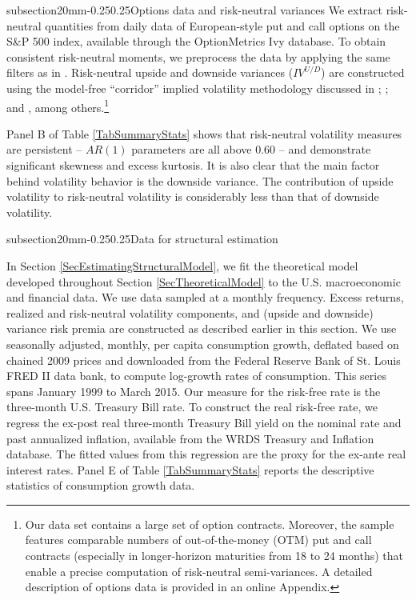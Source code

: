 \documentclass[11pt]{article}
\makeatletter
\renewcommand\subsection{\@startsection%
    {subsection}{2}{0mm}{-0.25\baselineskip}{0.25\baselineskip}{\bfseries\large}}
\makeatother
\begin{document}
\subsection{Options data and risk-neutral variances}
We extract risk-neutral quantities from daily data of European-style put and call options on the S\&P 500 index, available through the OptionMetrics Ivy database. To obtain consistent risk-neutral moments, we preprocess the data by applying the same filters as in \cite{ChangChristoffersenJacobs13JFE}. Risk-neutral upside and downside variances ($IV^{U/D}$) are constructed using the model-free ``corridor'' implied volatility methodology discussed in \cite{AndersenBondarenkoGonzalez14CorridorVol}; \cite{AndersenBondarenko07}; and \cite{CarrMadan99OptionPriceFormula}, among others.\footnote{Our data set contains a large set of option contracts. Moreover, the sample features comparable numbers of out-of-the-money (OTM) put and call contracts (especially in longer-horizon maturities from 18 to 24 months) that enable a precise computation of risk-neutral semi-variances. A detailed description of options data is provided in an online Appendix.}

Panel B of Table \ref{TabSummaryStats} shows that risk-neutral volatility measures are persistent -- $AR(1)$ parameters are all above 0.60 -- and demonstrate significant skewness and excess kurtosis. It is also clear that the main factor behind volatility behavior is the downside variance.
The contribution of upside volatility to risk-neutral volatility is considerably less than that of downside volatility.

\subsection{Data for structural estimation}

In Section \ref{SecEstimatingStructuralModel}, we fit the theoretical model developed throughout Section \ref{SecTheoreticalModel} to the U.S. macroeconomic and financial data. We use data sampled at a monthly frequency. Excess returns, realized and risk-neutral volatility components, and (upside and downside) variance risk premia are constructed as described earlier in this section. We use seasonally adjusted, monthly, per capita consumption growth, deflated based on chained 2009 prices and downloaded from the Federal Reserve Bank of St. Louis FRED II data bank, to compute log-growth rates of consumption.  This series spans January 1999 to March 2015. Our measure for the risk-free rate is the three-month U.S. Treasury Bill rate. To construct the real risk-free rate, we regress the ex-post real three-month Treasury Bill yield on the nominal rate and past annualized inflation, available from the WRDS Treasury and Inflation database. The fitted values from this regression are the proxy for the ex-ante real interest rates. Panel E of Table \ref{TabSummaryStats} reports the descriptive statistics of consumption growth data.
\end{document}
